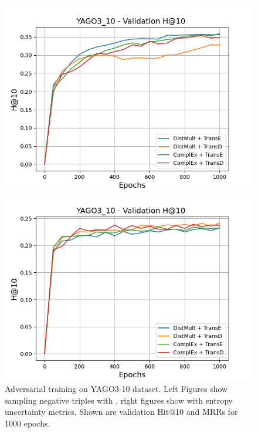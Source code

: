 \begin{figure}[H]
\begin{minipage}{.5\textwidth}
    \end{minipage}
    \begin{minipage}{.5\textwidth}
      \centering
      \includegraphics[width=0.9\linewidth]{figures/results/gan_train/not_pretrained/random/yago3_10/1k_epochs/random_yago3_10_hit10.png}
    \end{minipage}%
    \begin{minipage}{.5\textwidth}
      \centering
      \includegraphics[width=0.9\linewidth]{figures/results/gan_train/not_pretrained/uncertainty/max_distribution/entropy/yago3_10/1k_epochs/uncertainty_yago3_10_hit10.png}
    \end{minipage}%
    \caption{Adversarial training on \textsc{YAGO3-10} dataset. 
    Left Figures show sampling negative triples with \origsampling, right figures show \ussoftmax with entropy uncertainty metrics.
    Shown are validation Hit@10 and MRRs for 1000 epochs.}
    \label{fig:advtrain_yago3_10_random_vs_uncertainty}
\end{figure}

